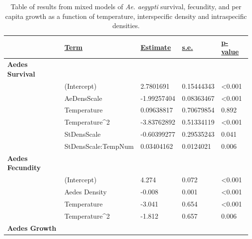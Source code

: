 \documentclass[12pt,]{article}
\begin{document}
\begin{table}[]
\centering
\caption{Table of results from mixed models of \textit{Ae. aegypti} survival, fecundity, and per capita growth as a function of temperature, interspecific density and intraspecific densities. }
\label{ref:tab}
\begin{tabular}{lllll}
\textbf{}       & {\ul \textbf{Term}}           & {\ul \textbf{Estimate}} & {\ul \textbf{s.e.}} & {\ul \textbf{p-value}} \\
\hline
\textbf{Aedes Survival}  &                               &                         &                     &                        \\
                & (Intercept)                   & 2.7801691               & 0.15444343          & \textless0.001         \\
                & AeDensScale                   & -1.99257404             & 0.08363467          & \textless0.001         \\
                & Temperature                   & 0.09638817              & 0.70679854          & 0.892                  \\
                & Temperature\textasciicircum 2 & -3.83762892             & 0.51334119          & \textless0.001         \\
                & StDensScale                   & -0.60399277             & 0.29535243          & 0.041                  \\
                & StDensScale:TempNum           & 0.03404162              & 0.0124021           & 0.006                  \\
\hline
\textbf{Aedes Fecundity} &                               &                         &                     &                        \\
                & (Intercept)                   & 4.274                   & 0.072               & \textless0.001         \\
                & Aedes Density                 & -0.008                  & 0.001               & \textless0.001         \\
                & Temperature                   & -3.041                  & 0.654               & \textless0.001         \\
                & Temperature\textasciicircum 2 & -1.812                  & 0.657               & 0.006                  \\
\hline
\textbf{Aedes Growth}    &                               &                         &                     &                        \\

\end{tabular}
\end{table}
\end{document}

